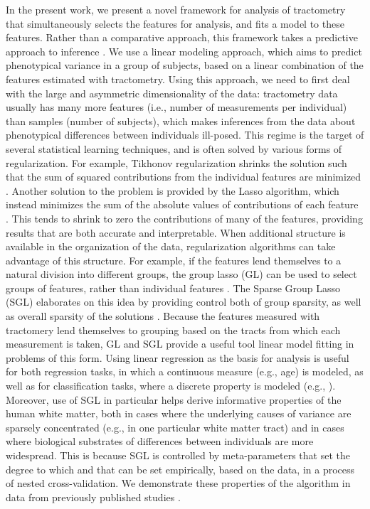 In the present work, we present a novel framework for analysis of tractometry
that simultaneously selects the features for analysis, and fits a model to these
features. Rather than a comparative approach, this framework takes a predictive
approach to inference \cite{Breiman2001-uz}. We use a linear modeling approach,
which aims to predict phenotypical variance in a group of subjects, based on a
linear combination of the features estimated with tractometry. Using this
approach, we need to first deal with the large and asymmetric dimensionality of
the data: tractometry data usually has many more features (i.e., number of
measurements per individual) than samples (number of subjects), which makes
inferences from the data about phenotypical differences between individuals
ill-posed. This regime is the target of several statistical learning techniques,
and is often solved by various forms of regularization. For example, Tikhonov
regularization shrinks the solution such that the sum of squared contributions
from the individual features are minimized \cite{Hoerl2000-ij}. Another solution
to the problem is provided by the Lasso algorithm, which instead minimizes the
sum of the absolute values of contributions of each feature
\cite{Tibshirani1996-qs}. This tends to shrink to zero the contributions of many
of the features, providing results that are both accurate and interpretable.
When additional structure is available in the organization of the data,
regularization algorithms can take advantage of this structure. For example, if
the features lend themselves to a natural division into different groups, the
group lasso (GL) can be used to select groups of features, rather than
individual features \cite{Yuan2006-ky}. The Sparse Group Lasso (SGL) elaborates
on this idea by providing control both of group sparsity, as well as overall
sparsity of the solutions \cite{simon2013sgl}. Because the features measured
with tractomery lend themselves to grouping based on the tracts from which each
measurement is taken, GL and SGL provide a useful tool linear model fitting in
problems of this form. Using linear regression as the basis for analysis is
useful for both regression tasks, in which a continuous measure (e.g., age) is
modeled, as well as for classification tasks, where a discrete property is
modeled (e.g., ). Moreover, use of SGL in particular helps derive informative
properties of the human white matter, both in cases where the underlying causes
of variance are sparsely concentrated (e.g., in one particular white matter
tract) and in cases where biological substrates of differences between
individuals are more widespread. This is because SGL is controlled by
meta-parameters that set the degree to  which and that can be set empirically,
based on the data, in a process of nested cross-validation. We demonstrate these
properties of the algorithm in data from previously published studies
\cite{sarica2017corticospinal, yeatman2014lifespan}.
